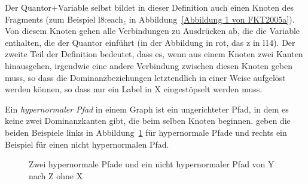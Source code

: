 Der Quantor+Variable selbst bildet in dieser Definition auch einen Knoten des Fragments (zum
Beispiel l8:each$_z$ in Abbildung~\ref{Abbildung 1 von FKT2005a}). 
Von diesem
Knoten gehen alle Verbindungen zu Ausdrücken ab, die die Variable enthalten, die der Quantor
einführt (in der Abbildung in rot, das z in l14). Der zweite Teil der Definition bedeutet, dass es,
wenn aus einem Knoten zwei Kanten hinausgehen, irgendwie eine andere Verbindung zwischen diesen
Knoten geben muss, so dass die Dominanzbeziehungen letztendlich in einer Weise aufgelöst werden
können, so dass nur ein Label in X eingestöpselt werden muss. 

Ein \emph{hypernormaler Pfad} in einem Graph ist ein ungerichteter Pfad, in dem es keine zwei
Dominanzkanten gibt, die beim selben Knoten beginnen. \citet{FKT2005a} geben die beiden Beispiele
links in Abbildung~\ref{Abbildung hypernormaler Graph} für hypernormale Pfade und rechts ein Beispiel für einen nicht hypernormalen Pfad.
\begin{figure}
\hfill
{}
\hfill
{}
\hfill
{}
\hfill\mbox{}
\caption{Zwei hypernormale Pfade und ein nicht hypernormaler Pfad von Y nach Z ohne X}\label{Abbildung hypernormaler Graph}
\end{figure}

